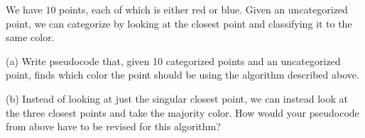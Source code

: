 We have $10$ points, each of which is either red or blue. Given an uncategorized point, we can categorize by looking at the closest point and classifying it to the same color.

(a) Write pseudocode that, given 10 categorized points and an uncategorized point, finds which color the point should be using the algorithm described above.

(b) Instead of looking at just the singular closest point, we can instead look at the three closest points and take the majority color. How would your pseudocode from above have to be revised for this algorithm?
